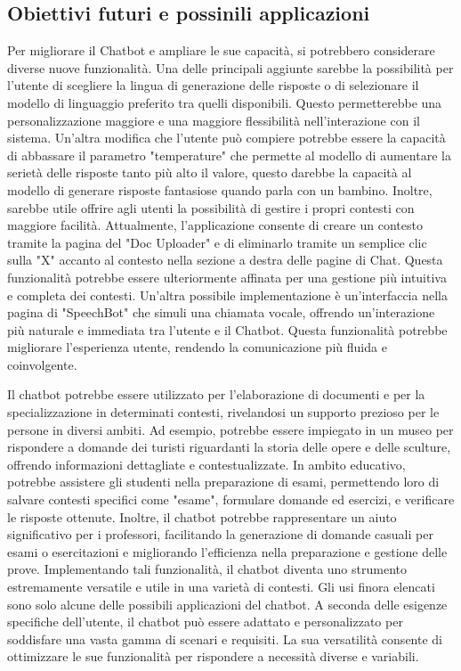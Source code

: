 \subsection{Obiettivi futuri e possinili applicazioni}
Per migliorare il Chatbot e ampliare le sue capacità, si potrebbero considerare diverse nuove funzionalità. Una delle principali aggiunte sarebbe la possibilità per l'utente di scegliere la lingua di generazione delle risposte o di selezionare il modello di linguaggio preferito tra quelli disponibili. Questo permetterebbe una personalizzazione maggiore e una maggiore flessibilità nell'interazione con il sistema.
Un'altra modifica che l'utente può compiere potrebbe essere la capacità di abbassare il parametro "temperature" che permette al modello di aumentare la serietà delle risposte tanto più alto il valore, questo darebbe la capacità al modello di generare risposte fantasiose quando parla con un bambino.
Inoltre, sarebbe utile offrire agli utenti la possibilità di gestire i propri contesti con maggiore facilità. Attualmente, l'applicazione consente di creare un contesto tramite la pagina del "Doc Uploader" e di eliminarlo tramite un semplice clic sulla "X" accanto al contesto nella sezione a destra delle pagine di Chat. Questa funzionalità potrebbe essere ulteriormente affinata per una gestione più intuitiva e completa dei contesti.
Un'altra possibile implementazione è un'interfaccia nella pagina di "SpeechBot" che simuli una chiamata vocale, offrendo un'interazione più naturale e immediata tra l'utente e il Chatbot. Questa funzionalità potrebbe migliorare l'esperienza utente, rendendo la comunicazione più fluida e coinvolgente.
\newline

Il chatbot potrebbe essere utilizzato per l'elaborazione di documenti e per la specializzazione in determinati contesti, rivelandosi un supporto prezioso per le persone in diversi ambiti. Ad esempio, potrebbe essere impiegato in un museo per rispondere a domande dei turisti riguardanti la storia delle opere e delle sculture, offrendo informazioni dettagliate e contestualizzate. In ambito educativo, potrebbe assistere gli studenti nella preparazione di esami, permettendo loro di salvare contesti specifici come "esame", formulare domande ed esercizi, e verificare le risposte ottenute. Inoltre, il chatbot potrebbe rappresentare un aiuto significativo per i professori, facilitando la generazione di domande casuali per esami o esercitazioni e migliorando l'efficienza nella preparazione e gestione delle prove. Implementando tali funzionalità, il chatbot diventa uno strumento estremamente versatile e utile in una varietà di contesti.
Gli usi finora elencati sono solo alcune delle possibili applicazioni del chatbot. A seconda delle esigenze specifiche dell'utente, il chatbot può essere adattato e personalizzato per soddisfare una vasta gamma di scenari e requisiti. La sua versatilità consente di ottimizzare le sue funzionalità per rispondere a necessità diverse e variabili.
